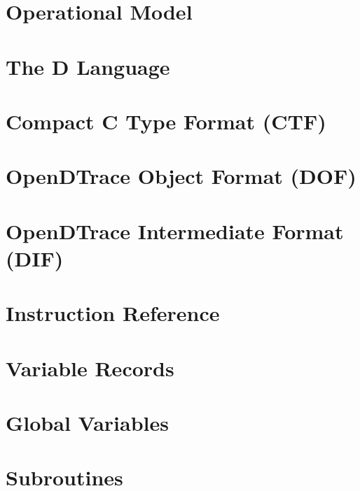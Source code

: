 \chapter{Operational Model}
\label{chap:opendtrace-operation}


\chapter{The D Language}
\label{chap:opendtrace-dlang}


\chapter{Compact C Type Format (CTF)}
\label{chap:opendtrace-ctf}


\chapter{OpenDTrace Object Format (DOF)}
\label{chap:opendtrace-object-format}


\chapter{OpenDTrace Intermediate Format (DIF)}
\label{chap:opendtrace-intermediate-format}


\chapter{Instruction Reference}
\label{chap:opendtrace-instruction-reference}


\chapter{Variable Records}
\label{chap:opendtrace-variable-records}


\chapter{Global Variables}
\label{chap:opendtrace-global-vars}


\chapter{Subroutines}
\label{chap:opendtrace-subroutines}



